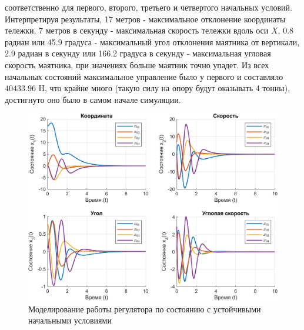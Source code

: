 соответственно для первого, второго, третьего и четвертого начальных условий.
Интерпретируя результаты, 17 метров - максимальное отклонение 
координаты тележки, 7 метров в секунду - максимальная скорость тележки вдоль оси $X$,
0.8 радиан или 45.9 градуса - максимальный угол отклонения маятника от вертикали,
2.9 радиан в секунду или 166.2 градуса в секунду - максимальная угловая скорость маятника,
при значениях больше маятник точно упадет. Из всех начальных состояний максимальное 
управление было у первого и составляло $40433.96$ H, что крайне много (такую силу на опору будут оказывать 4 тонны), 
достигнуто оно было в самом начале симуляции.

\begin{figure}[H]
    \centering
    \includegraphics[width=\linewidth]{figs/3.1.good.png}
    \caption{Моделирование работы регулятора по состоянию с 
    устойчивыми начальными условиями}
    \label{fig:3.1.good}
\end{figure}

